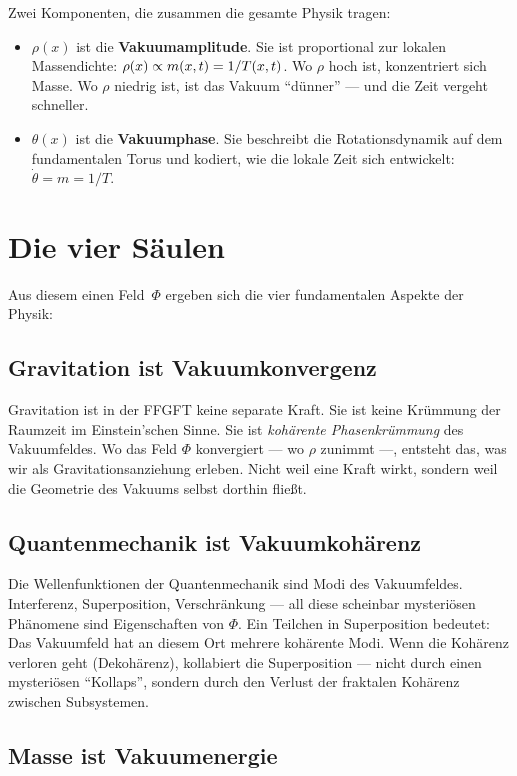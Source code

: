 Zwei Komponenten, die zusammen die gesamte Physik tragen:
\begin{itemize}
\item $\rho(x)$ ist die \textbf{Vakuumamplitude}. Sie ist proportional zur lokalen Massendichte: $\rho(x) \propto m(x,t) = 1/T(x,t)$. Wo $\rho$ hoch ist, konzentriert sich Masse. Wo $\rho$ niedrig ist, ist das Vakuum \enquote{dünner} --- und die Zeit vergeht schneller.
\item $\theta(x)$ ist die \textbf{Vakuumphase}. Sie beschreibt die Rotationsdynamik auf dem fundamentalen Torus und kodiert, wie die lokale Zeit sich entwickelt: $\dot{\theta} = m = 1/T$.
\end{itemize}

\section{Die vier Säulen}

Aus diesem einen Feld~$\Phi$ ergeben sich die vier fundamentalen Aspekte der Physik:

\subsection{Gravitation ist Vakuumkonvergenz}

Gravitation ist in der FFGFT keine separate Kraft. Sie ist keine Krümmung der Raumzeit im Einstein'schen Sinne. Sie ist \emph{kohärente Phasenkrümmung} des Vakuumfeldes. Wo das Feld $\Phi$ konvergiert --- wo $\rho$ zunimmt ---, entsteht das, was wir als Gravitationsanziehung erleben. Nicht weil eine Kraft wirkt, sondern weil die Geometrie des Vakuums selbst dorthin fließt.

\subsection{Quantenmechanik ist Vakuumkohärenz}

Die Wellenfunktionen der Quantenmechanik sind Modi des Vakuumfeldes. Interferenz, Superposition, Verschränkung --- all diese scheinbar mysteriösen Phänomene sind Eigenschaften von $\Phi$. Ein Teilchen in Superposition bedeutet: Das Vakuumfeld hat an diesem Ort mehrere kohärente Modi. Wenn die Kohärenz verloren geht (Dekohärenz), kollabiert die Superposition --- nicht durch einen mysteriösen \enquote{Kollaps}, sondern durch den Verlust der fraktalen Kohärenz zwischen Subsystemen.

\subsection{Masse ist Vakuumenergie}

